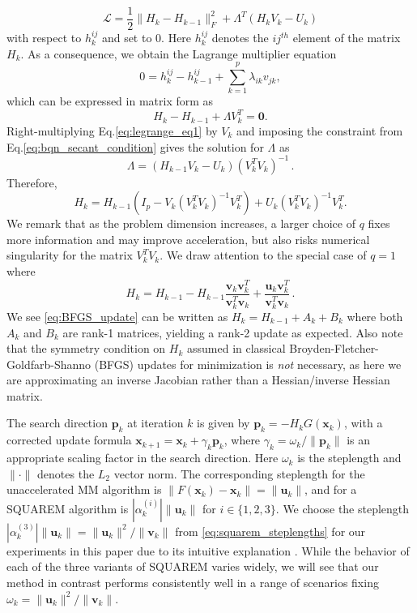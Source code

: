 \documentclass{statsoc}
\newcommand{\bp}{\boldsymbol{p}}
\newcommand{\bu}{\boldsymbol{u}}
\newcommand{\bv}{\boldsymbol{v}}
\newcommand{\bx}{\boldsymbol{x}}
\begin{document}
\[
\mathcal{L} = \dfrac{1}{2}\|H_{k} - H_{k-1}\|^2_F + \Lambda^T(H_{k}V_k - U_k)
\]
with respect to $h_{k}^{ij}$ and set to ${0}$. Here $h_{k}^{ij}$ denotes the $ij^{th}$ element of the matrix $H_{k}$. As a consequence, we obtain the Lagrange multiplier equation
\[
0 = h_{k}^{ij} - h_{k-1}^{ij} + \sum_{k=1}^{p}\lambda_{ik}v_{jk},
\]
which can be expressed in matrix form as
\begin{equation} \label{eq:legrange_eq1}
H_{k} - H_{k-1} + \Lambda V_k^T = \mathbf{0}   .
\end{equation}
Right-multiplying Eq.\eqref{eq:legrange_eq1} by $V_k$ and imposing the constraint from Eq.\eqref{eq:bqn_secant_condition} gives the solution for $\Lambda$ as
\[
     \Lambda = (H_{k-1} V_k - U_k)(V_k^TV_k)^{-1}\,.
\]
Therefore, 
\begin{equation}
H_{k} = H_{k-1}\left(I_p - V_k (V_k^T V_k)^{-1}V_k^T\right) + U_k(V_k^T V_k)^{-1}V_k^T.
\end{equation}
We remark that as the problem dimension increases, a larger choice of $q$ fixes more information and may improve acceleration, but also risks numerical singularity for the matrix $V_k^T V_k$. We draw attention to the special case of $q=1$ where %
\begin{equation} \label{eq:BFGS_update}
    H_{k} = H_{k-1} - H_{k-1}\dfrac{\bv_k\bv_k^T}{\bv_k^T\bv_k} + \dfrac{\bu_k\bv_k^T}{\bv_k^T\bv_k}\,.
\end{equation}
We see \eqref{eq:BFGS_update} can be written as $H_{k} = H_{k-1} + A_k + B_k$ where both $A_k$ and $B_k$ are rank-1 matrices, yielding a rank-2 update as expected. Also note that the symmetry condition on $H_k$ assumed in classical Broyden-Fletcher-Goldfarb-Shanno (BFGS) updates for minimization is \textit{not} necessary, as here we are approximating an inverse Jacobian  rather than a Hessian/inverse Hessian matrix.

The search direction $\bp_k$ at iteration $k$ is given by $\bp_k = -H_{k}G(\bx_k)$, with a corrected update formula $\bx_{k+1} = \bx_k + \gamma_k \bp_k$, where $\gamma_k = \omega_k /\|\bp_k\|$ is an appropriate scaling factor in the search direction. Here $\omega_k$ is the steplength and $\|\cdot\|$ denotes the $L_2$ vector norm. The corresponding steplength for the unaccelerated MM algorithm is $\|F(\bx_k) - \bx_k\| = \|\bu_k\|$, and for a SQUAREM algorithm is $|\alpha_k^{(i)}| \|\bu_k\|$ for $i \in \{1,2,3\}$. We choose the steplength $|\alpha_k^{(3)}| \|\bu_k\| = \|\bu_k\|^2/\|\bv_k\|$ from \eqref{eq:squarem_steplengths} for our experiments in this paper due to its intuitive explanation \citep{varadhan2008simple}. %
While the behavior of each of the three variants of SQUAREM varies widely, we will see that our method in contrast performs consistently well in a range of scenarios fixing  $\omega_k =\|\bu_k\|^2/\|\bv_k\|$.
\end{document}
